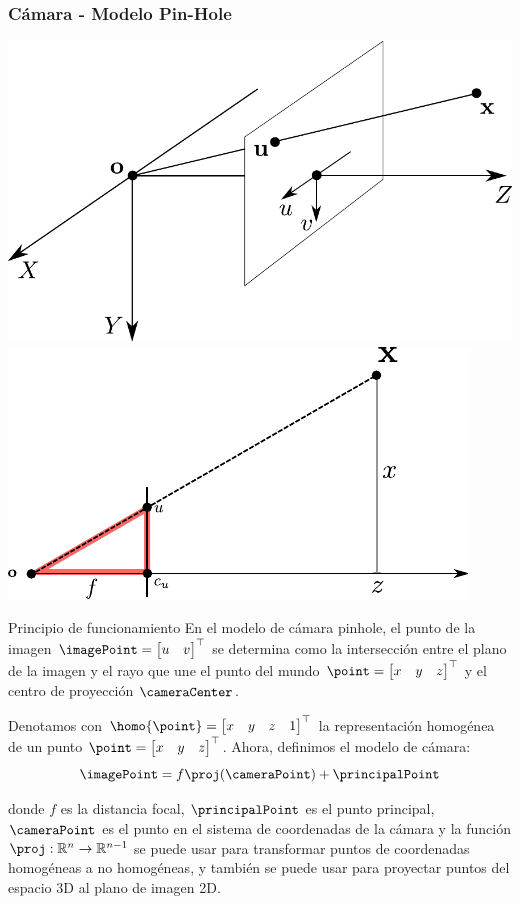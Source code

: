 \begin{frame}
    \frametitle{Cámara - Modelo Pin-Hole}
    
    
    \includegraphics[width=0.4\columnwidth]{images/pinhole_camera_model.pdf}
    \includegraphics[width=0.4\columnwidth]{images/pinhole_camera_model2.pdf}
    \footnotesize
    
    \begin{block}{Principio de funcionamiento}
        En el modelo de cámara pinhole, el punto de la imagen $\imagePoint=\begin{bmatrix}u & v\end{bmatrix}^{\top}$ se determina como la intersección entre el plano de la imagen y el rayo que une el punto del mundo $\point =\begin{bmatrix}x & y & z\end{bmatrix}^{\top}$ y el centro de proyección $\cameraCenter$.
    \end{block}
    
    Denotamos con $\homo{\point}=\begin{bmatrix}x & y & z & 1\end{bmatrix}^{\top}$ la representación homogénea de un punto $\point=\begin{bmatrix}x & y & z\end{bmatrix}^{\top}$. Ahora, definimos el modelo de cámara:
    \begin{equation*}
        \imagePoint=f\proj(\cameraPoint)+\principalPoint
    \end{equation*}
    
    donde $f$ es la distancia focal, $\principalPoint$ es el punto principal, $\cameraPoint$ es el punto en el sistema de coordenadas de la cámara y la función $\proj:\mathbb{R}^{n}\rightarrow\mathbb{R}^{n- 1}$ se puede usar para transformar puntos de coordenadas homogéneas a no homogéneas, y también se puede usar para proyectar puntos del espacio 3D al plano de imagen 2D.	
\end{frame}

